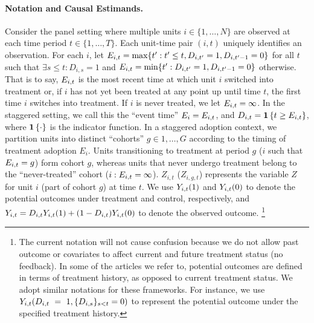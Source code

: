 \documentclass[12pt]{article}
\begin{document}
\paragraph*{Notation and Causal Estimands.} Consider the panel setting where multiple units $i\in\{1,\dots,N\}$ are observed at each time period $t\in\{1,\dots,T\}$. Each unit-time pair $(i,t)$ uniquely identifies an observation. 
For each $i$, let $E_{i,t}=\max\{t':t' \leq t, D_{i,t'}=1, D_{i,t'-1}=0\}$ for all $t$ such that $\exists s \leq t: D_{i,s}=1$ and $E_{i,t}=\min\{t':D_{i,t'}=1, D_{i,t'-1}=0\}$ otherwise. That is to say, $E_{i,t}$ is the most recent time at which unit $i$ switched into treatment or, if $i$ has not yet been treated at any point up until time $t$, the first time $i$ switches into treatment. If $i$ is never treated, we let $E_{i,t}=\infty$.
In the staggered setting, we call this the ``event time'' $E_i=E_{i,t}$, and
$D_{i,t}=\mathbf{1}\left\{t \geq E_{i,t}\right\}$, where $\mathbf{1}\left\{\cdot\right\}$ is the indicator function. 
In a staggered adoption context, we partition units into distinct ``cohorts'' $g\in{1,\dots,G}$ according to the timing of treatment adoption $E_i$. Units transitioning to treatment at period $g$ ($i$ such that $E_{i,t}=g$) form cohort $g$, whereas units that never undergo treatment belong to the ``never-treated'' cohort ($i:E_{i,t}=\infty$). $Z_{i,t}$ ($Z_{i,g,t}$) represents the variable $Z$ for unit $i$ (part of cohort $g$) at time $t$. We use $Y_{i,t}(1)$ and $Y_{i,t}(0)$ to denote the potential outcomes under treatment and control, respectively, and $Y_{i,t}=D_{i,t} Y_{i,t}(1) + (1-D_{i,t})Y_{i,t}(0)$ to denote the observed outcome.%
%
\footnote{The current notation will not cause confusion because we do not allow past outcome or covariates to affect current and future treatment status (no feedback). In some of the articles we refer to, potential outcomes are defined in
terms of treatment history, as opposed to current treatment status. We adopt
similar notations for these frameworks. For instance, we use $Y_{i,t}(D_{i,t}~=~1,
\{D_{i,s}\}_{s<t}=0)$ to represent the potential outcome under the specified
treatment history. } %
\end{document}
